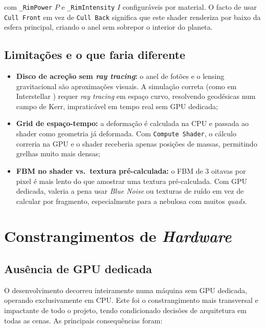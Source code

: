 \documentclass[12pt,a4paper]{article}
\begin{document}
com \texttt{\_RimPower} $P$ e \texttt{\_RimIntensity} $I$ configur\'{a}veis por material. O facto de usar \texttt{Cull Front} em vez de \texttt{Cull Back} significa que este shader renderiza por baixo da esfera principal, criando o anel sem sobrepor o interior do planeta.

\subsection{Limita\c{c}\~{o}es e o que faria diferente}

\begin{itemize}
  \item \textbf{Disco de acre\c{c}\~{a}o sem \textit{ray tracing}:} o anel de fot\~{o}es e o lensing gravitacional s\~{a}o aproxima\c{c}\~{o}es visuais. A simula\c{c}\~{a}o correta (como em Interstellar \cite{james2015}) requer \textit{ray tracing} em espa\c{c}o curvo, resolvendo geod\'{e}sicas num campo de Kerr, impratic\'{a}vel em tempo real sem GPU dedicada;
  
  \item \textbf{Grid de espa\c{c}o-tempo:} a deforma\c{c}\~{a}o \'{e} calculada na CPU e passada ao shader como geometria j\'{a} deformada. Com \texttt{Compute Shader}, o c\'{a}lculo correria na GPU e o shader receberia apenas posi\c{c}\~{o}es de massas, permitindo grelhas muito mais densas;
  
  \item \textbf{FBM no shader vs.\ textura pr\'{e}-calculada:} o FBM de 3 oitavas por pixel \'{e} mais lento do que amostrar uma textura pr\'{e}-calculada. Com GPU dedicada, valeria a pena usar \textit{Blue Noise} ou texturas de ru\'{i}do em vez de calcular por fragmento, especialmente para a nebulosa com muitos \textit{quads}.
\end{itemize}

\section{Constrangimentos de \textit{Hardware}}

\subsection{Aus\^{e}ncia de GPU dedicada}

O desenvolvimento decorreu inteiramente numa m\'{a}quina sem GPU dedicada, operando exclusivamente em CPU. Este foi o constrangimento mais transversal e impactante de todo o projeto, tendo condicionado decis\~{o}es de arquitetura em todas as cenas. As principais consequ\^{e}ncias foram:
\end{document}
